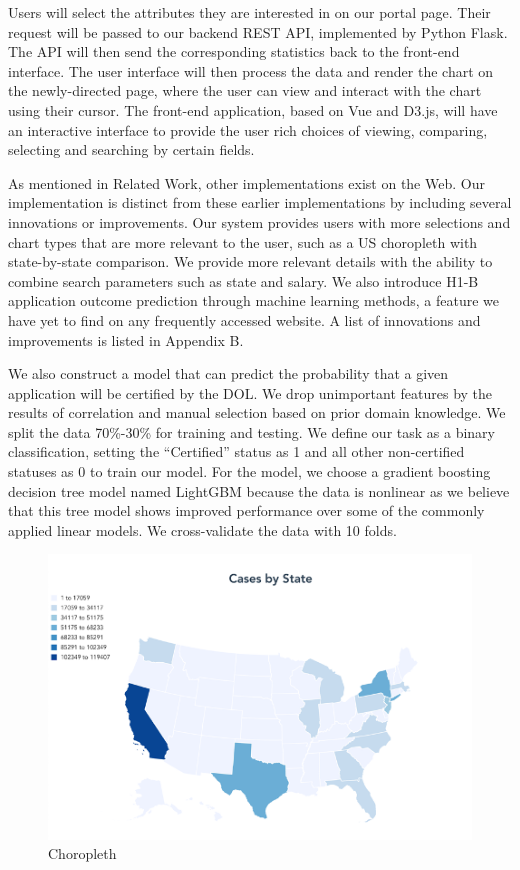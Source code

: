 \documentclass[sigconf]{acmart}
\begin{document}
Users will select the attributes they are interested in on our portal page. Their request will be passed to our 
backend REST API, implemented by Python Flask. The API will then send the corresponding statistics back to the 
front-end interface. The user interface will then process the data and render the chart on the newly-directed page, 
where the user can view and interact with the chart using their cursor. The front-end application, based on Vue and D3.js, 
will have an interactive interface to provide the user rich choices of viewing, comparing, selecting and searching by certain fields. 



As mentioned in Related Work, other implementations exist on the Web. Our implementation is distinct from these earlier 
implementations by including several innovations or improvements. Our system provides users with more selections and 
chart types that are more relevant to the user, such as a US choropleth with state-by-state comparison. 
We provide more relevant details with the ability to combine search parameters such as state and salary. 
We also introduce H1-B application outcome prediction through machine learning methods, a feature we have yet to find on 
any frequently accessed website. A list of innovations and improvements is listed in Appendix B.  


We also construct a model that can predict the probability that a given application will be certified by the DOL. 
We drop unimportant features by the results of correlation and manual selection based on prior domain knowledge. 
We split the data 70\%-30\% for training and testing. 
We define our task as a binary classification, setting the “Certified” status as 1 and all other non-certified statuses 
as 0 to train our model. For the model, we choose a gradient boosting decision tree model named LightGBM because the data 
is nonlinear as we believe that this tree model shows improved performance over some of the commonly applied linear models. 
We cross-validate the data with 10 folds. 



\begin{figure}
  \includegraphics[width=\linewidth]{fig1.png}
  \caption{Choropleth}
  \label{fig:choropleth}
\end{figure}
\end{document}

